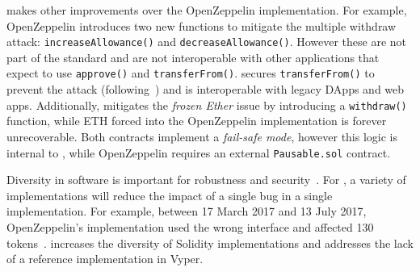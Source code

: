 
\sys makes other improvements over the OpenZeppelin implementation. For example, OpenZeppelin introduces two new functions to mitigate the multiple withdraw attack: \texttt{increaseAllowance()} and \texttt{decreaseAllowance()}. However these are not part of the \erc standard and are not  interoperable with other applications that expect to use \texttt{approve()} and \texttt{transferFrom()}. \sys secures \texttt{transferFrom()} to prevent the attack (following~\cite{ERC20MWA}) and is interoperable with legacy DApps and web apps. Additionally, \sys mitigates the \textit{frozen Ether} issue by introducing a \texttt{withdraw()} function, while ETH forced into the OpenZeppelin implementation is forever unrecoverable. Both contracts implement a \textit{fail-safe mode}, however this logic is internal to \sys, while OpenZeppelin requires an external \texttt{Pausable.sol} contract.

Diversity in software is important for robustness and security~\cite{FSA97,FHS97}. For \erc, a variety of implementations will reduce the impact of a single bug in a single implementation. For example, between 17 March 2017 and 13 July 2017, OpenZeppelin's implementation used the wrong interface and affected 130 tokens~\cite{ErcBug}. \sys increases the diversity of \erc Solidity implementations and addresses the lack of a reference implementation in Vyper.



